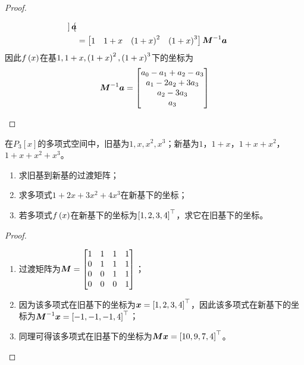 \begin{proof}
\begin{enumerate}
{\begin{align*}
\begin{bmatrix}
                  \end{bmatrix}\boldsymbol{a} \\
                   & =
                  \begin{bmatrix}
                      1 & 1+x & \left( 1+x \right)^2 & \left( 1+x \right)^3
                  \end{bmatrix}{\boldsymbol{M}}^{-1}\boldsymbol{a}
              \end{align*}
              因此\(f\left( x \right)\)在基\(1,1+x,\left( 1+x \right)^2,\left( 1+x \right)^3\)下的坐标为
              \begin{equation*}
                  {\boldsymbol{M}}^{-1}\boldsymbol{a}=
                  \begin{bmatrix}
                      a_0-a_1+a_2-a_3 \\
                      a_1-2a_2+3a_3   \\
                      a_2-3a_3        \\
                      a_3
                  \end{bmatrix}
              \end{equation*}
              }
    \end{enumerate}
\end{proof}

\begin{problem}
在\(P_3[x]\)的多项式空间中，旧基为\(1,x,x^2,x^3\)；新基为\(1\)，\(1+x\)，\(1+x+x^2\)，\(1+x+x^2+x^3\)。
\begin{enumerate}
    \item 求旧基到新基的过渡矩阵；
    \item 求多项式\(1+2x+3x^2+4x^3\)在新基下的坐标；
    \item 若多项式\(f\left( x \right)\)在新基下的坐标为\(\left[ 1,2,3,4 \right]^\top\)，求它在旧基下的坐标。
\end{enumerate}
\end{problem}
\begin{proof}
    \begin{enumerate}
        \item 过渡矩阵为\(\boldsymbol{M}=\begin{bmatrix}1&1&1&1\\0&1&1&1\\0&0&1&1\\0&0&0&1\end{bmatrix}\)；
        \item 因为该多项式在旧基下的坐标为\(\boldsymbol{x}=\left[ 1,2,3,4 \right]^\top\)，因此该多项式在新基下的坐标为\({\boldsymbol{M}}^{-1}\boldsymbol{x}=\left[ -1,-1,-1,4 \right]^\top\)；
        \item 同理可得该多项式在旧基下的坐标为\(\boldsymbol{M}\boldsymbol{x}=\left[ 10,9,7,4 \right]^\top\)。
    \end{enumerate}
\end{proof}

